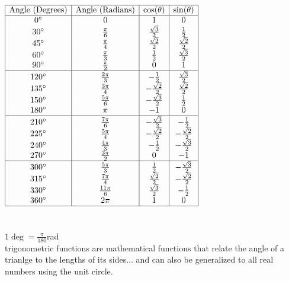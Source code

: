 \documentclass{article}
\begin{document}
\\
\\
\\
$
\begin{array}{|c|c|c|c|}
\hline
\text{Angle (Degrees)} & \text{Angle (Radians)} & \cos(\theta) & \sin(\theta) \\
\hline
0^\circ & 0 & 1 & 0 \\
30^\circ & \frac{\pi}{6} & \frac{\sqrt{3}}{2} & \frac{1}{2} \\
45^\circ & \frac{\pi}{4} & \frac{\sqrt{2}}{2} & \frac{\sqrt{2}}{2} \\
60^\circ & \frac{\pi}{3} & \frac{1}{2} & \frac{\sqrt{3}}{2} \\
90^\circ & \frac{\pi}{2} & 0 & 1 \\
\hline
120^\circ & \frac{2\pi}{3} & -\frac{1}{2} & \frac{\sqrt{3}}{2} \\
135^\circ & \frac{3\pi}{4} & -\frac{\sqrt{2}}{2} & \frac{\sqrt{2}}{2} \\
150^\circ & \frac{5\pi}{6} & -\frac{\sqrt{3}}{2} & \frac{1}{2} \\
180^\circ & \pi & -1 & 0 \\
\hline
210^\circ & \frac{7\pi}{6} & -\frac{\sqrt{3}}{2} & -\frac{1}{2} \\
225^\circ & \frac{5\pi}{4} & -\frac{\sqrt{2}}{2} & -\frac{\sqrt{2}}{2} \\
240^\circ & \frac{4\pi}{3} & -\frac{1}{2} & -\frac{\sqrt{3}}{2} \\
270^\circ & \frac{3\pi}{2} & 0 & -1 \\
\hline
300^\circ & \frac{5\pi}{3} & \frac{1}{2} & -\frac{\sqrt{3}}{2} \\
315^\circ & \frac{7\pi}{4} & \frac{\sqrt{2}}{2} & -\frac{\sqrt{2}}{2} \\
330^\circ & \frac{11\pi}{6} & \frac{\sqrt{3}}{2} & -\frac{1}{2} \\
360^\circ & 2\pi & 1 & 0 \\
\hline
\end{array}
$
\\
\\
\\

$1 \deg = \frac{\pi}{180}$rad\\

trigonometric functions are mathematical functions that relate the angle of a trianlge to the lengths of its sides... and can also be generalized to all real numbers using the unit circle.\\
\end{document}

